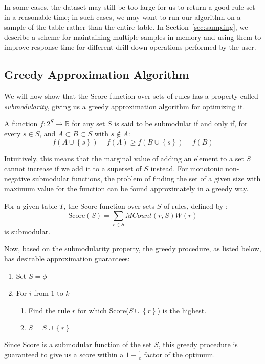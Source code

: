 In some cases, the dataset may still be too large for us to return a good rule set in
a reasonable time; in such cases, we may want to run our algorithm on a sample of the table
rather than the entire table. In Section~\ref{sec:sampling}, we describe a scheme 
for maintaining multiple samples in memory and using them to improve response 
time for different drill down operations performed by the user. 

\subsection{Greedy Approximation Algorithm}\label{sec:greedy-approx}
 We will now show that the Score function over sets of rules has a property called {\em submodularity}, giving us a greedy approximation algorithm for optimizing it. 
\begin{definition}
A function $f: 2^S \rightarrow \mathbb{R}$ for any set $S$ is said to be submodular if and only if, for every $s \in S$, and $A \subset B \subset S$ with $s \notin A$:
$$f(A \cup \left\lbrace s \right\rbrace) - f(A) \geq f(B \cup \left\lbrace s \right\rbrace) - f(B)$$
\end{definition}
Intuitively, this means that the marginal value of adding an element to a set $S$ cannot increase if we add it to a superset of $S$ instead. For monotonic non-negative submodular functions, the problem of finding the set of a given size with maximum value for the function can be found approximately in a greedy way. 

\begin{lemma}\label{lemma:submodular}
For a given table $T$, the Score function over sets $S$ of rules, defined by :
$$\text{Score}(S) = \sum_{r \in S} MCount(r,S)W(r)$$
is submodular.
\end{lemma}

 Now, based on the submodularity property, the greedy procedure,
as listed below, has desirable approximation guarantees:
\begin{framed}
\vspace{-15pt}
\begin{enumerate}
\item Set $S = \phi$
\item For $i$ from $1$ to $k$
\begin{enumerate}
\item Find the rule $r$ for which Score($S \cup \left\lbrace r \right\rbrace$) is the highest.
\item $S = S \cup \left\lbrace r \right\rbrace$
\end{enumerate}
\end{enumerate}
\vspace{-15pt}
\end{framed}
Since Score is a submodular function of the set $S$, 
this greedy procedure is guaranteed to give us a score within a $1 - \frac{1}{e}$ factor of the optimum. 

